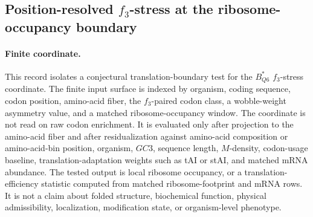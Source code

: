 \subsection{Position-resolved $f_3$-stress at the ribosome-occupancy boundary}\label{subsec:q6-f3-stress-position-resolved-ribosome-occupancy-translation-boundary}

\paragraph{Finite coordinate.}
This record isolates a conjectural translation-boundary test for the $B^*_{Q6}$ $f_3$-stress coordinate.  The finite input surface is indexed by organism, coding sequence, codon position, amino-acid fiber, the $f_3$-paired codon class, a wobble-weight asymmetry value, and a matched ribosome-occupancy window.  The coordinate is not read on raw codon enrichment.  It is evaluated only after projection to the amino-acid fiber and after residualization against amino-acid composition or amino-acid-bin position, organism, $GC3$, sequence length, $M$-density, codon-usage baseline, translation-adaptation weights such as tAI or stAI, and matched mRNA abundance.  The tested output is local ribosome occupancy, or a translation-efficiency statistic computed from matched ribosome-footprint and mRNA rows.  It is not a claim about folded structure, biochemical function, physical admissibility, localization, modification state, or organism-level phenotype.

